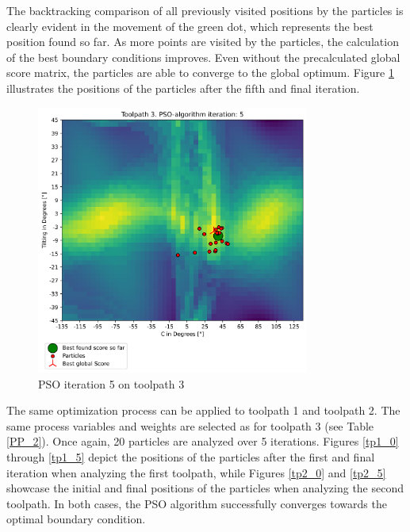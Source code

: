 The backtracking comparison of all previously visited positions by the particles is clearly evident in the movement of the green dot, which represents the best position found so far. As more points are visited by the particles, the calculation of the best boundary conditions improves. Even without the precalculated global score matrix, the particles are able to converge to the global optimum.
Figure \ref{5_true} illustrates the positions of the particles after the fifth and final iteration.
\newpage
\begin{figure}[H]
	\centerline{\includegraphics[width=0.8\textwidth]{figures/swarm_true/3_5.png}}
	\caption{PSO iteration 5 on toolpath 3}
	\label{5_true}
\end{figure}



The same optimization process can be applied to toolpath 1 and toolpath 2. The same process variables and weights are selected as for toolpath 3 (see Table \ref{PP_2}). Once again, 20 particles are analyzed over 5 iterations. Figures \ref{tp1_0} through \ref{tp1_5} depict the positions of the particles after the first and final iteration when analyzing the first toolpath, while Figures \ref{tp2_0} and \ref{tp2_5} showcase the initial and final positions of the particles when analyzing the second toolpath. In both cases, the PSO algorithm successfully converges towards the optimal boundary condition.
\newpage
	
